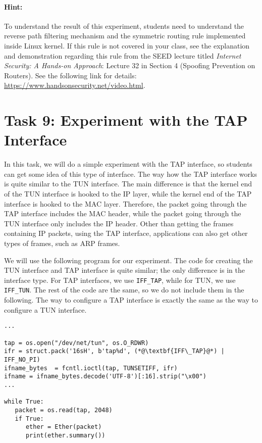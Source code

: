 \paragraph{Hint:} To understand the result of 
this experiment, students need to understand the reverse path filtering mechanism
and the symmetric routing rule implemented inside Linux kernel. 
If this rule is not covered in your class, see 
the explanation and demonstration regarding this rule from the
SEED lecture titled \textit{Internet Security: A Hands-on Approach}: Lecture 32
in Section 4 (Spoofing Prevention on Routers). See the following link for 
details: \url{https://www.handsonsecurity.net/video.html}.







\section{Task 9: Experiment with the TAP Interface}

In this task, we will do a simple experiment with the TAP interface, so students
can get some idea of this type of interface. The way how the TAP interface works is 
quite similar to the TUN interface. The main difference is that the 
kernel end of the TUN interface is hooked to the IP layer, while the 
kernel end of the TAP interface is hooked to the MAC layer. 
Therefore, the packet going through the TAP interface includes the MAC header,
while the packet going through the TUN interface only includes the IP header. 
Other than getting the frames containing IP packets, using the TAP interface, 
applications can also get other types of frames, such as ARP frames. 


We will use the following program for our experiment. The code 
for creating the TUN interface and TAP interface is quite similar; the 
only difference is in the interface type. For TAP interfaces, we use
\texttt{IFF\_TAP}, while for TUN,  we use \texttt{IFF\_TUN}.
The rest of the code are the same, so we do not include them in the 
following. The way to configure a TAP interface is exactly the same 
as the way to configure a TUN interface. 


\begin{lstlisting}
...

tap = os.open("/dev/net/tun", os.O_RDWR)
ifr = struct.pack('16sH', b'tap%d', (*@\textbf{IFF\_TAP}@*) | IFF_NO_PI)
ifname_bytes  = fcntl.ioctl(tap, TUNSETIFF, ifr)
ifname = ifname_bytes.decode('UTF-8')[:16].strip("\x00")
... 

while True:
   packet = os.read(tap, 2048)
   if True:
      ether = Ether(packet)
      print(ether.summary())
\end{lstlisting}
 
